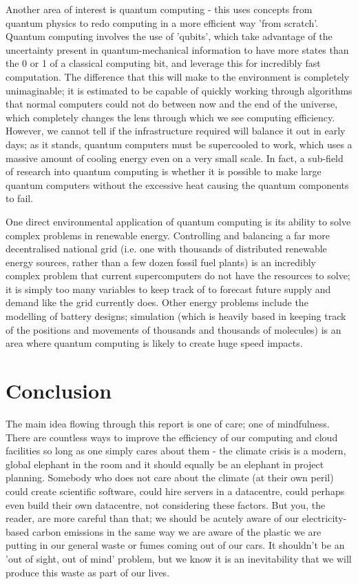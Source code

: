 \documentclass{article}
\begin{document}
Another area of interest is quantum computing - this uses concepts from quantum physics to redo computing in a more efficient way 'from scratch'. Quantum computing involves the use of 'qubits', which take advantage of the uncertainty present in quantum-mechanical information to have more states than the 0 or 1 of a classical computing bit, and leverage this for incredibly fast computation. \citep{national2019quantum} The difference that this will make to the environment is completely unimaginable; it is estimated to be capable of quickly working through algorithms that normal computers could not do between now and the end of the universe, which completely changes the lens through which we see computing efficiency. \citep{gyongyosi2019survey} However, we cannot tell if the infrastructure required will balance it out in early days; as it stands, quantum computers must be supercooled to work, which uses a massive amount of cooling energy even on a very small scale. In fact, a sub-field of research into quantum computing is whether it is possible to make large quantum computers without the excessive heat causing the quantum components to fail. \citep{ikonen2017energy}\newline

One direct environmental application of quantum computing is its ability to solve complex problems in renewable energy. Controlling and balancing a far more decentralised national grid (i.e. one with thousands of distributed renewable energy sources, rather than a few dozen fossil fuel plants) is an incredibly complex problem that current supercomputers do not have the resources to solve; it is simply too many variables to keep track of to forecast future supply and demand like the grid currently does. Other energy problems include the modelling of battery designs; simulation (which is heavily based in keeping track of the positions and movements of thousands and thousands of molecules) is an area where quantum computing is likely to create huge speed impacts. \citep{giani2021quantum}

\section{Conclusion}
The main idea flowing through this report is one of care; one of mindfulness. There are countless ways to improve the efficiency of our computing and cloud facilities so long as one simply cares about them - the climate crisis is a modern, global elephant in the room and it should equally be an elephant in project planning. Somebody who does not care about the climate (at their own peril) could create scientific software, could hire servers in a datacentre, could perhaps even build their own datacentre, not considering these factors. But you, the reader, are more careful than that; we should be acutely aware of our electricity-based carbon emissions in the same way we are aware of the plastic we are putting in our general waste or fumes coming out of our cars. It shouldn't be an 'out of sight, out of mind' problem, but we know it is an inevitability that we will produce this waste as part of our lives.\newline
\end{document}
